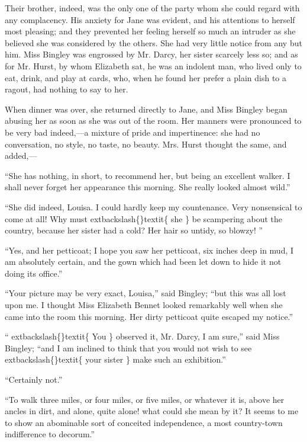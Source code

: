 \documentclass[10pt]{book}
\begin{document}
   Their brother, indeed, was the only one of the party whom she could
regard with any complacency. His anxiety for Jane was evident, and his
attentions to herself most pleasing; and they prevented her feeling
herself so much an intruder as she believed she was considered by the
others. She had very little notice from any but him. Miss Bingley was
engrossed by Mr. Darcy, her sister scarcely less so; and as for Mr.
Hurst, by whom Elizabeth sat, he was an indolent man, who lived only to
eat, drink, and play at cards, who, when he found her prefer a plain
dish to a ragout, had nothing to say to her.
  

   When dinner was over, she returned directly to Jane, and Miss Bingley
began abusing her as soon as she was out of the room. Her manners were
pronounced to be very bad indeed,—a mixture of pride and impertinence:
she had no conversation, no style, no taste, no beauty. Mrs. Hurst
thought the same, and added,—
  

   “She has nothing, in short, to recommend her, but being an excellent
walker. I shall never forget her appearance this morning. She really
looked almost wild.”
  

   “She did indeed, Louisa. I could hardly keep my countenance. Very
nonsensical to come at all! Why must
   	extbackslash\{\}textit\{
    she
   \}
   be scampering about the
country, because her sister had a cold? Her hair so untidy, so blowzy!
   ”
  

   “Yes, and her petticoat; I hope you saw her petticoat, six inches deep
in mud, I am absolutely certain, and the gown which had been let down to
hide it not doing its office.”
  

   “Your picture may be very exact, Louisa,” said Bingley; “but this was
all lost upon me. I thought Miss Elizabeth Bennet looked remarkably well
when she came into the room this morning. Her dirty petticoat quite
escaped my notice.”
  

   “
   	extbackslash\{\}textit\{
    You
   \}
   observed it, Mr. Darcy, I am sure,” said Miss Bingley; “and I am
inclined to think that you would not wish to see
   	extbackslash\{\}textit\{
    your sister
   \}
   make such
an exhibition.”
  

   “Certainly not.”
  

   “To walk three miles, or four miles, or five miles, or whatever it is,
above her ancles in dirt, and alone, quite alone! what could she mean by
it? It seems to me to show an abominable sort of conceited independence,
a most country-town indifference to decorum.”
  
\end{document}
